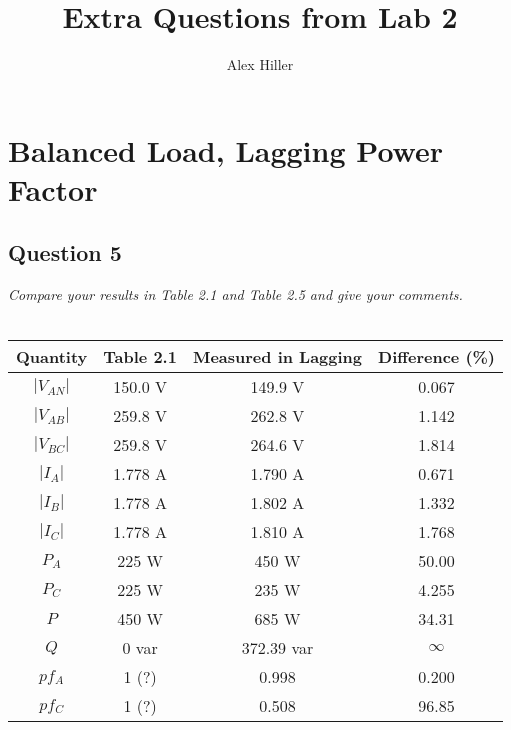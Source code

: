 \documentclass{article}
\author{Alex Hiller}
\title{Extra Questions from Lab 2}
\begin{document}
\maketitle
\clearpage
\tableofcontents
\clearpage
\setlength{\parindent}{0cm}
\setlength{\parskip}{0.125cm}
\section{Balanced Load, Lagging Power Factor}
  \subsection{Question 5}  
  \textit{Compare your results in Table 2.1 and Table 2.5 and give your comments.} \\ \\
  \begin{centering}
  \begin{tabular}{|c|c|c|c|} \hline
    Quantity    & Table 2.1   & Measured in Lagging   & Difference (\%) \\ \hline
    $|V_{AN}|$  & 150.0 V     & 149.9 V               & 0.067     \\ \hline
    $|V_{AB}|$  & 259.8 V     & 262.8 V               & 1.142     \\ \hline
    $|V_{BC}|$  & 259.8 V     & 264.6 V               & 1.814     \\ \hline
    $|I_{A}|$   & 1.778 A     & 1.790 A               & 0.671     \\ \hline
    $|I_{B}|$   & 1.778 A     & 1.802 A               & 1.332     \\ \hline
    $|I_{C}|$   & 1.778 A     & 1.810 A               & 1.768     \\ \hline
    $P_{A}$     & 225 W       & 450 W                 & 50.00     \\ \hline
    $P_{C}$     & 225 W       & 235 W                 & 4.255     \\ \hline
    $P$         & 450 W       & 685 W                 & 34.31     \\ \hline
    $Q$         & 0 var       & 372.39 var            & $\infty$  \\ \hline
    $pf_A$      & 1 (?)       & 0.998                 & 0.200     \\ \hline
    $pf_C$      & 1 (?)       & 0.508                 & 96.85     \\ \hline
  \end{tabular} \\
  \end{centering}
  \noindent \\
  
\end{document}
